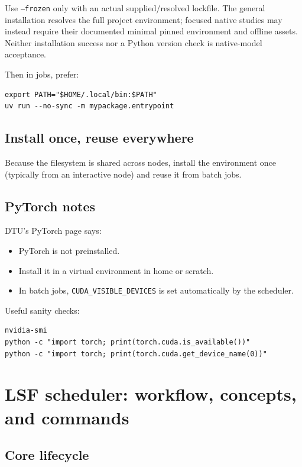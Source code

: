 \documentclass[11pt,a4paper]{article}
\begin{document}
Use \texttt{--frozen} only with an actual supplied/resolved lockfile. The general
installation resolves the full project environment; focused native studies may
instead require their documented minimal pinned environment and offline assets.
Neither installation success nor a Python version check is native-model acceptance.

Then in jobs, prefer:

\begin{lstlisting}[style=shell]
export PATH="$HOME/.local/bin:$PATH"
uv run --no-sync -m mypackage.entrypoint
\end{lstlisting}

\subsection{Install once, reuse everywhere}

Because the filesystem is shared across nodes, install the environment once (typically from an interactive node) and reuse it from batch jobs.

\subsection{PyTorch notes}

DTU's PyTorch page says:

\begin{itemize}[leftmargin=1.5em]
  \item PyTorch is not preinstalled.
  \item Install it in a virtual environment in home or scratch.
  \item In batch jobs, \texttt{CUDA\_VISIBLE\_DEVICES} is set automatically by the scheduler.
\end{itemize}

Useful sanity checks:

\begin{lstlisting}[style=shell]
nvidia-smi
python -c "import torch; print(torch.cuda.is_available())"
python -c "import torch; print(torch.cuda.get_device_name(0))"
\end{lstlisting}

\section{LSF scheduler: workflow, concepts, and commands}

\subsection{Core lifecycle}
\end{document}
